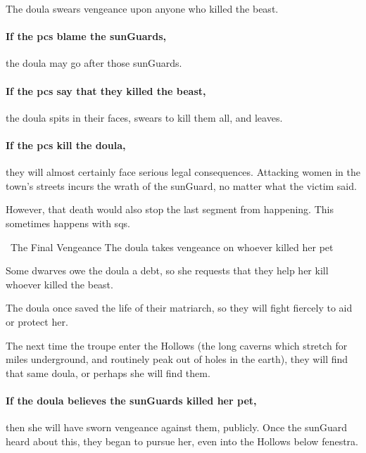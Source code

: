 \begin{multicols}{2}
The \gls{doula} swears vengeance upon anyone who killed the beast.

\paragraph{If the \glspl{pc} blame the \glspl{sunGuard},}
the \gls{doula} may go after those \glspl{sunGuard}.

\paragraph{If the \glspl{pc} say that they killed the beast,}
the \gls{doula} spits in their faces, swears to kill them all, and leaves.

\paragraph{If the \glspl{pc} kill the \gls{doula},}
they will almost certainly face serious legal consequences.
Attacking women in the town's streets incurs the wrath of the \gls{sunGuard}, no matter what the victim said.

However, that death would also stop the last \gls{segment} from happening.
This sometimes happens with \glspl{sq}.

{\squash~The Final Vengeance}%
{The \gls{doula} takes vengeance on whoever killed her pet}%

\begin{exampletext}
  Some dwarves owe the \gls{doula} a debt, so she requests that they help her kill whoever killed the beast.

  The \gls{doula} once saved the life of their matriarch, so they will fight fiercely to aid or protect her.
\end{exampletext}

The next time the troupe enter the Hollows (the long caverns which stretch for miles underground, and routinely peak out of holes in the earth), they will find that same \gls{doula}, or perhaps she will find them.

\paragraph{If the \gls{doula} believes the \glspl{sunGuard} killed her pet,}
then she will have sworn vengeance against them, publicly.
Once the \gls{sunGuard} heard about this, they began to pursue her, even into the Hollows below \gls{fenestra}.


\end{multicols}

